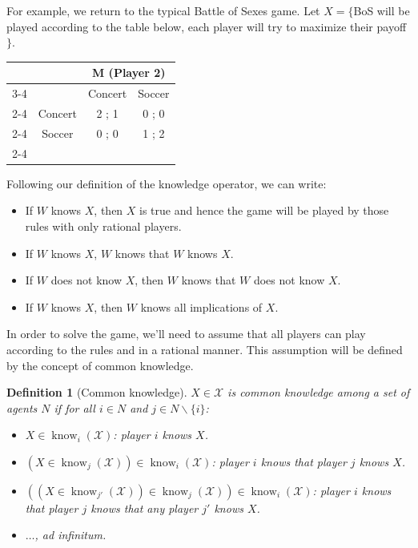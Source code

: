 \documentclass[12pt]{report}
\newtheorem{definition}{Definition}[chapter]
\newcommand{\know}{\operatorname{know}}
\begin{document}
For example, we return to the typical Battle of Sexes game. Let $X = \{$BoS will be played according to the table below, each player will try to maximize their payoff $\}$.
\begin{table}[ht!]
\centering
\begin{tabular}{cccc}
 &  & \multicolumn{2}{c}{\textbf{M (Player 2)}} \\ \cline{3-4} 
 & \multicolumn{1}{c|}{} & \multicolumn{1}{c|}{Concert} & \multicolumn{1}{c|}{Soccer} \\ \cline{2-4} 
\multicolumn{1}{c|}{\multirow{2}{*}{\textbf{W (Player 1)}}} & \multicolumn{1}{c|}{Concert} & \multicolumn{1}{c|}{2 ; 1} & \multicolumn{1}{c|}{0 ; 0} \\ \cline{2-4} 
\multicolumn{1}{c|}{} & \multicolumn{1}{c|}{Soccer} & \multicolumn{1}{c|}{0 ; 0} & \multicolumn{1}{c|}{1 ; 2} \\ \cline{2-4} 
\end{tabular}
\end{table}

Following our definition of the knowledge operator, we can write:\begin{itemize}
\item If $W$ knows $X$, then $X$ is true and hence the game will be played by those rules with only rational players. 
\item If $W$ knows $X$, $W$ knows that $W$ knows $X$. \item If $W$ does not know $X$, then $W$ knows that $W$ does not know $X$. 
\item If $W$ knows  $X$, then $W$ knows all implications of $X$.
\end{itemize}

In order to solve the game, we'll need to assume that all players can play according to the rules and in a rational manner. This assumption will be defined by the concept of common knowledge.

\begin{definition}[Common knowledge]
$X\in\mathcal{X}$ is common knowledge among a set of agents $N$ if for all $i\in N$ and $j\in N\backslash\{i\}$:\begin{itemize}
\item $X\in\know_i(\mathcal{X})$: player $i$ knows $X$.
\item $(X\in\know_j(\mathcal{X}))\in\know_i(\mathcal{X})$: player $i$ knows that player $j$ knows $X$.
\item $((X\in\know_{j'}(\mathcal{X}))\in\know_{j}(\mathcal{X}))\in\know_i(\mathcal{X})$: player $i$ knows that player $j$ knows that any player $j'$ knows $X$.
\item $\hdots$, ad infinitum.
\end{itemize}
\end{definition}
\newpage
\end{document}
